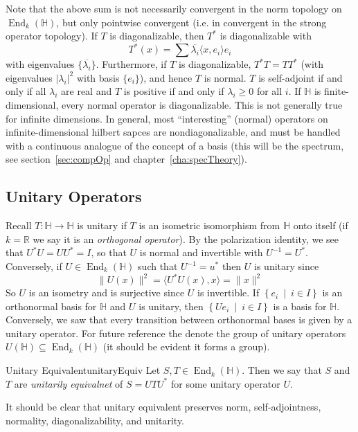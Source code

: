 \documentclass[oneside]{book}
\newcommand{\R}{\mathbb{R}}
\renewcommand{\H}{\mathbb{H}}
\newcommand{\sse}{\subseteq}
\newcommand{\oln}{\overline}
\newcommand{\End}{\operatorname{End}}
\newcommand{\set}[2]{\left\{#1 \ \middle|\ #2\right\}}
\begin{document}
Note that the above sum is not necessarily convergent in the norm topology on $\End_k(\H)$, but only pointwise
convergent (i.e. in convergent in the strong operator topology). If $T$ is diagonalizable, then $T^*$ is diagonalizable
with
\[
	T^*(x) = \sum \oln{\lambda_i} \langle x, e_i \rangle e_i
\]
with eigenvalues $\{ \oln{\lambda_i}\}$. Furthermore, if $T$ is diagonalizable, $T^*T = TT^*$ (with eigenvalues $|\lambda_i|^2$ with basis
$\{e_i\}$), and hence $T$ is normal. $T$ is self-adjoint if and only if all $\lambda_i$ are real and $T$ is positive
if and only if $\lambda_i \ge 0$ for all $i$. If $\H$ is finite-dimensional, every normal operator is diagonalizable.
This is not generally true for infinite dimensions. In general, most ``interesting'' (normal) operators on
infinite-dimensional hilbert sapces are nondiagonalizable, and must be handled with a continuous analogue of the
concept of a basis (this will be the spectrum, see section~\ref{sec:compOp} and chapter~\ref{cha:specTheory}).

\subsection*{Unitary Operators}

Recall $T: \H \to \H$ is unitary if $T$ is an isometric isomorphism from $\H$ onto itself (if $k = \R$ we say
it is an \emph{orthogonal operator}). By the polarization identity, we see that $U^*U = UU^* = I$, so that $U$ is
normal and invertible with $U^{-1} = U^*$. Conversely, if $U \in \End_k(\H)$ such that $U^{-1} = u^*$ then $U$ is
unitary since
\[
	\|U(x)\|^2 = \langle U^*U(x), x \rangle = \|x\|^2
\]
So $U$ is an isometry and is surjective since $U$ is invertible. If $\set{e_i}{i \in I}$ is an orthonormal basis for
$\H$ and $U$ is unitary, then $\set{Ue_i}{i \in I}$ is a basis for $\H$. Conversely, we saw that every transition
between orthonormal bases is given by a unitary operator. For future reference the denote the group of unitary
operators $U(\H) \sse \End_k(\H)$ (it should be evident it forms a group).

\begin{defn}{Unitary Equivalent}{unitaryEquiv}
	Let $S,T \in \End_k(\H)$. Then we say that $S$ and $T$ are \emph{unitarily equivalnet} of $S = UTU^*$ for some
	unitary operator $U$.
\end{defn}

It should be clear that unitary equivalent preserves norm, self-adjointness, normality, diagonalizability, and
unitarity.
\end{document}

